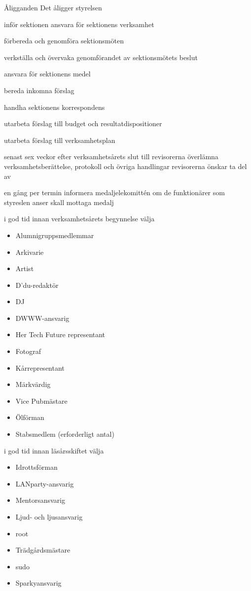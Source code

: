 \documentclass[pdfbookmarks,a4paper,11pt]{article}
\newlength{\itemcollength}
\newenvironment{reglemlista}{%
  \begin{list}{}{%
      \setlength{\labelwidth}{\itemcollength}%
      \setlength{\leftmargin}{\labelwidth + \labelsep}%
      \renewcommand{\makelabel}[1]{%
        \raisebox{0pt}[1ex][0pt]{%
          \makebox[\labelwidth][l]{%
            \parbox[t]{\itemcollength}{%
              \raggedright\hspace{0pt}##1}}}\hfill}%
      }}{%
  \end{list}}
\begin{document}
\begin{reglemlista}
	\item[Åligganden]
	Det åligger styrelsen
	\begin{attlista}
		\item inför sektionen ansvara för sektionens verksamhet
		\item förbereda och genomföra sektionsmöten
		\item verkställa och övervaka genomförandet av sektionsmötets beslut
		\item ansvara för sektionens medel
		\item bereda inkomna förslag
		\item handha sektionens korrespondens
		\item utarbeta förslag till budget och resultatdispositioner
		\item utarbeta förslag till verksamhetsplan
		\item senast sex veckor efter verksamhetsårets slut till revisor\-erna överlämna verksamhetsberättelse, protokoll och övriga handlingar revisorerna önskar ta del av
		\item en gång per termin informera medaljelekomittén om de funktionärer som styreslen anser skall mottaga medalj
		\item i god tid innan verksamhetsårets begynnelse välja
		\begin{itemize}
			\item Alumnigruppsmedlemmar
			\item Arkivarie
			\item Artist
			\item D'du-redaktör
			\item DJ
			\item DWWW-ansvarig
			\item Her Tech Future representant
			\item Fotograf
			\item Kårrepresentant
			\item Märkvärdig
			\item Vice Pubmästare
			\item Ölförman
			\item Stabsmedlem (erforderligt antal)
		\end{itemize}
		\item i god tid innan läsårsskiftet välja
		\begin{itemize}
			\item Idrottsförman
			\item LANparty-ansvarig
			\item Mentorsansvarig
			\item Ljud- och ljusansvarig
			\item root
			\item Trädgårdsmästare
			\item sudo
			\item Sparkyansvarig
		\end{itemize}
	\end{attlista}


\end{reglemlista}
\end{document}

